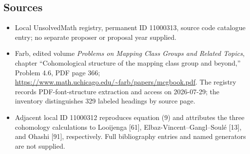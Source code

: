 \documentclass[11pt]{article}
\begin{document}
\subsection{Sources}
\begin{itemize}
\item Local UnsolvedMath registry, permanent ID 11000313, source code catalogue entry; no separate proposer or proposal year supplied.
\item Farb, edited volume \emph{Problems on Mapping Class Groups and Related Topics}, chapter ``Cohomological structure of the mapping class group and beyond,'' Problem 4.6, PDF page 366; \url{https://www.math.uchicago.edu/~farb/papers/mcgbook.pdf}. The registry records PDF-font-structure extraction and access on 2026-07-29; the inventory distinguishes 329 labeled headings by source page.
\item Adjacent local ID 11000312 reproduces equation (9) and attributes the three cohomology calculations to Looijenga [61], Elbaz-Vincent--Gangl--Soul\'e [13], and Ohashi [91], respectively. Full bibliography entries and named generators are not supplied.
\end{itemize}
\end{document}
